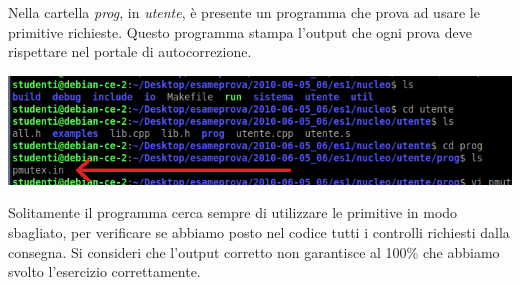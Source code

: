\begin{itemize}
	Nella cartella \emph{prog}, in \emph{utente}, è presente un programma che prova ad usare le primitive richieste. Questo programma stampa l'output che ogni prova deve rispettare nel portale di autocorrezione.
	\begin{center}
		\includegraphics{img/207.PNG}
	\end{center}
	Solitamente il programma cerca sempre di utilizzare le primitive in modo sbagliato, per verificare se abbiamo posto nel codice tutti i controlli richiesti dalla consegna. Si consideri che l'output corretto non garantisce al 100\% che abbiamo svolto l'esercizio correttamente.
\end{itemize}

